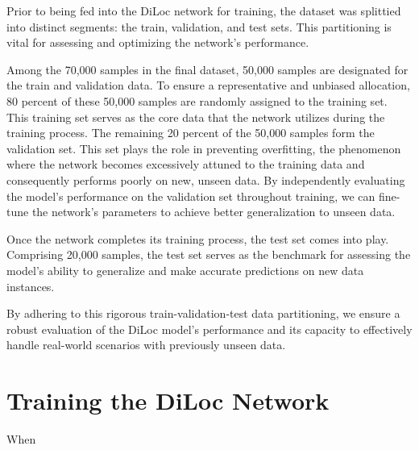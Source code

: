 \documentclass[a4paper, UKenglish, 11pt]{uiomaster}
\begin{document}
Prior to being fed into the DiLoc network for training, the dataset was splittied into distinct segments: the train, validation, and test sets. This partitioning is vital for assessing and optimizing the network's performance.

Among the 70,000 samples in the final dataset, 50,000 samples are designated for the train and validation data. To ensure a representative and unbiased allocation, 80 percent of these 50,000 samples are randomly assigned to the training set. This training set serves as the core data that the network utilizes during the training process. The remaining 20 percent of the 50,000 samples form the validation set. This set plays the role in preventing overfitting, the phenomenon where the network becomes excessively attuned to the training data and consequently performs poorly on new, unseen data. By independently evaluating the model's performance on the validation set throughout training, we can fine-tune the network's parameters to achieve better generalization to unseen data.

Once the network completes its training process, the test set comes into play. Comprising 20,000 samples, the test set serves as the benchmark for assessing the model's ability to generalize and make accurate predictions on new data instances.

By adhering to this rigorous train-validation-test data partitioning, we ensure a robust evaluation of the DiLoc model's performance and its capacity to effectively handle real-world scenarios with previously unseen data.


\section{Training the DiLoc Network}
When
\end{document}
